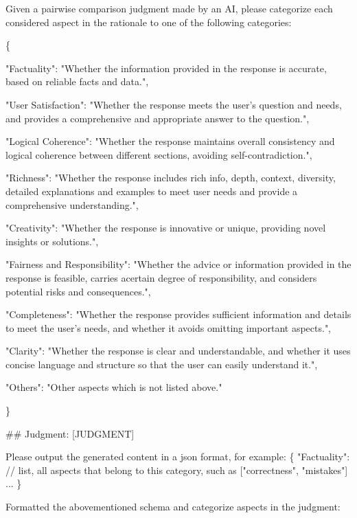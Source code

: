\begin{tcolorbox}[breakable, title=Judgment Dimension Categorization Prompt, label=test]
\small
\ttfamily
Given a pairwise comparison judgment made by an AI, please categorize each considered aspect in the rationale to one of the following categories:

\vspace{4mm}
\{
    
    \vspace{2mm}
    "Factuality": "Whether the information provided in the response is accurate, based on reliable facts and data.",

    \vspace{2mm}
    "User Satisfaction": "Whether the response meets the user's question and needs, and provides a comprehensive and appropriate answer to the question.",

    \vspace{2mm}
    "Logical Coherence": "Whether the response maintains overall consistency and logical coherence between different sections, avoiding self-contradiction.",

    \vspace{2mm}
    "Richness": "Whether the response includes rich info, depth, context, diversity, detailed explanations and examples to meet user needs and provide a comprehensive understanding.",

    \vspace{2mm}
    "Creativity": "Whether the response is innovative or unique, providing novel insights or solutions.",

    \vspace{2mm}
    "Fairness and Responsibility": "Whether the advice or information provided in the response is feasible, carries acertain degree of responsibility, and considers potential risks and consequences.",

    \vspace{2mm}
    "Completeness": "Whether the response provides sufficient information and details to meet the user's needs, and whether it avoids omitting important aspects.",

    \vspace{2mm}
    "Clarity": "Whether the response is clear and understandable, and whether it uses concise language and structure so that the user can easily understand it.",

    \vspace{2mm}
    "Others": "Other aspects which is not listed above."

\}

\vspace{4mm}
\#\# Judgment: [JUDGMENT]

\vspace{4mm}
Please output the generated content in a json format, for example:
\{
"Factuality": // list, all aspects that belong to this category, such as ["correctness", "mistakes"]
...
\}

\vspace{4mm}
Formatted the abovementioned schema and categorize aspects in the judgment:


\end{tcolorbox}
\label{}